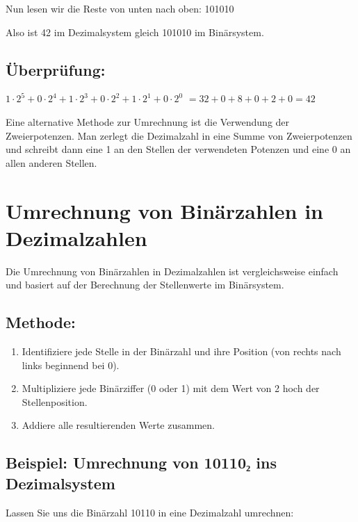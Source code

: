 \documentclass[
  nswissgerman,
  a4paper,
  DIV=11,
  numbers=noendperiod,
  ngerman]{scrreprt}
\providecommand{\tightlist}{%
  \setlength{\itemsep}{0pt}\setlength{\parskip}{0pt}}
\begin{document}
Nun lesen wir die Reste von unten nach oben: 101010

Also ist 42 im Dezimalsystem gleich 101010 im Binärsystem.

\subsection{Überprüfung:}\label{uxfcberpruxfcfung}

\(1 \cdot 2^5 + 0 \cdot 2^4 + 1 \cdot 2^3 + 0 \cdot 2^2 + 1 \cdot 2^1 + 0 \cdot 2^0\)
\(= 32 + 0 + 8 + 0 + 2 + 0 = 42\)

Eine alternative Methode zur Umrechnung ist die Verwendung der
Zweierpotenzen. Man zerlegt die Dezimalzahl in eine Summe von
Zweierpotenzen und schreibt dann eine 1 an den Stellen der verwendeten
Potenzen und eine 0 an allen anderen Stellen.

\section{Umrechnung von Binärzahlen in
Dezimalzahlen}\label{umrechnung-von-binuxe4rzahlen-in-dezimalzahlen}

Die Umrechnung von Binärzahlen in Dezimalzahlen ist vergleichsweise
einfach und basiert auf der Berechnung der Stellenwerte im Binärsystem.

\subsection{Methode:}\label{methode}

\begin{enumerate}
\def\labelenumi{\arabic{enumi}.}
\tightlist
\item
  Identifiziere jede Stelle in der Binärzahl und ihre Position (von
  rechts nach links beginnend bei 0).
\item
  Multipliziere jede Binärziffer (0 oder 1) mit dem Wert von 2 hoch der
  Stellenposition.
\item
  Addiere alle resultierenden Werte zusammen.
\end{enumerate}

\subsection{Beispiel: Umrechnung von 10110₂ ins
Dezimalsystem}\label{beispiel-umrechnung-von-10110ux2082-ins-dezimalsystem}

Lassen Sie uns die Binärzahl 10110 in eine Dezimalzahl umrechnen:
\end{document}
